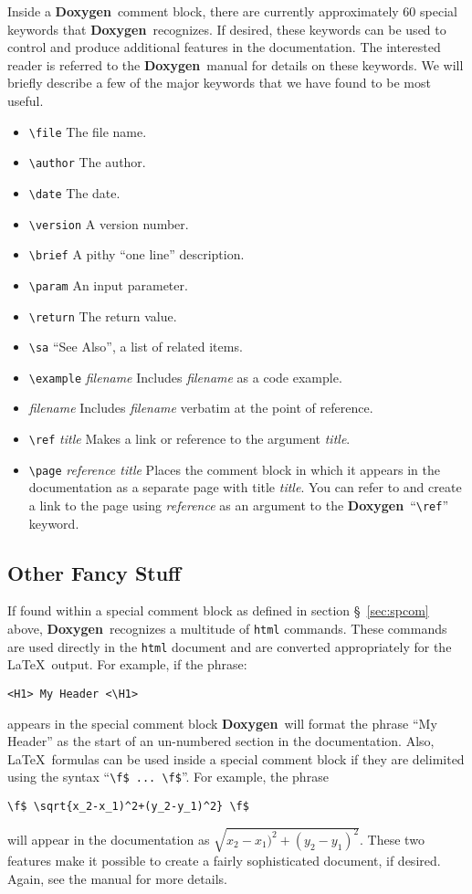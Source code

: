 \documentclass[11pt]{nmemo}
\newcommand{\doxy}{{\normalfont\bfseries Doxygen}}
\begin{document}
Inside a \doxy\ comment block, there are currently approximately 60
special keywords that \doxy\ recognizes. If desired, these keywords
can be used to control and produce additional features in the
documentation.  The interested reader is referred to the \doxy\ manual
for details on these keywords.  We will briefly describe a few of the major
keywords that we have found to be most useful.
\begin{itemize}
\item \verb+\file+ The file name.
\item \verb+\author+ The author.
\item \verb+\date+ The date.
\item \verb+\version+ A version number.
\item \verb+\brief+ A pithy ``one line'' description.
\item \verb+\param+ An input parameter.
\item \verb+\return+ The return value.
\item \verb+\sa+ ``See Also'', a list of related items.
\item \verb+\example+ {\em filename} Includes {\em filename} as a code
  example.
\item \verb++ {\em filename} Includes {\em filename} verbatim at the
  point of reference.
\item \verb+\ref+ {\em title} Makes a link or reference 
  to the argument {\em title}.
\item \verb+\page+ {\em reference title} Places the comment block in which
  it appears in the documentation as a separate page with title {\em
    title}. You can refer to and create a link to the page using {\em
    reference} as an argument to the \doxy\ ``\verb+\ref+'' keyword.
\end{itemize}

\subsection{Other Fancy Stuff}

If found within a special comment block 
as defined in section \S~\ref{sec:spcom} above, \doxy\ 
recognizes a multitude of \texttt{html} commands. These
commands are used directly in the \texttt{html} document and are converted 
appropriately for the \LaTeX\ output. 
For example, if the phrase: 
\begin{verbatim}
<H1> My Header <\H1>
\end{verbatim} appears in the special comment
block \doxy\ will format the phrase ``My Header'' as the start of an
un-numbered section in the documentation. 
Also, \LaTeX\ formulas can be used inside a special
comment block if they are delimited using the syntax ``\verb+\f$ ... \f$+''.
For example, the phrase 
\begin{verbatim}
\f$ \sqrt{x_2-x_1)^2+(y_2-y_1)^2} \f$ 
\end{verbatim}  will appear in the
documentation as $\sqrt{x_2-x_1)^2+(y_2-y_1)^2}$.
These two
features make it possible to create a fairly sophisticated document, if desired.
Again, see the manual for more details.
\end{document}
